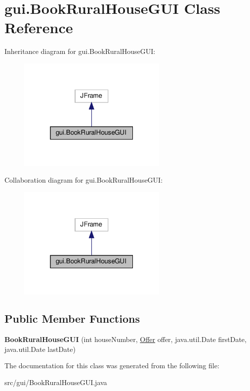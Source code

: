 \hypertarget{classgui_1_1_book_rural_house_g_u_i}{}\section{gui.\+Book\+Rural\+House\+G\+UI Class Reference}
\label{classgui_1_1_book_rural_house_g_u_i}


Inheritance diagram for gui.\+Book\+Rural\+House\+G\+UI\+:
\nopagebreak
\begin{figure}[H]
\begin{center}
\leavevmode
\includegraphics[width=205pt]{classgui_1_1_book_rural_house_g_u_i__inherit__graph}
\end{center}
\end{figure}


Collaboration diagram for gui.\+Book\+Rural\+House\+G\+UI\+:
\nopagebreak
\begin{figure}[H]
\begin{center}
\leavevmode
\includegraphics[width=205pt]{classgui_1_1_book_rural_house_g_u_i__coll__graph}
\end{center}
\end{figure}
\subsection*{Public Member Functions}
\begin{DoxyCompactItemize}
\item 
\mbox{\label{classgui_1_1_book_rural_house_g_u_i_ab5082ea450d86eda88075eecbbfe2b74}} 
{\bfseries Book\+Rural\+House\+G\+UI} (int house\+Number, \mbox{\hyperlink{classdomain_1_1_offer}{Offer}} offer, java.\+util.\+Date first\+Date, java.\+util.\+Date last\+Date)
\end{DoxyCompactItemize}


The documentation for this class was generated from the following file\+:\begin{DoxyCompactItemize}
\item 
src/gui/Book\+Rural\+House\+G\+U\+I.\+java\end{DoxyCompactItemize}
